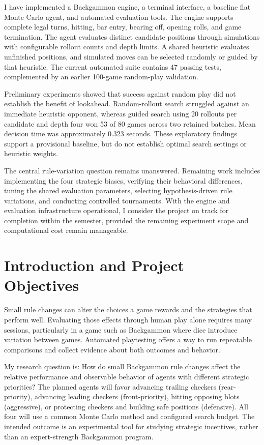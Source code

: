 \documentclass[12pt,twoside]{article}
\begin{document}
I have implemented a Backgammon engine, a terminal interface, a baseline flat Monte Carlo agent, and automated evaluation tools. The engine supports complete legal turns, hitting, bar entry, bearing off, opening rolls, and game termination. The agent evaluates distinct candidate positions through simulations with configurable rollout counts and depth limits. A shared heuristic evaluates unfinished positions, and simulated moves can be selected randomly or guided by that heuristic. The current automated suite contains 47 passing tests, complemented by an earlier 100-game random-play validation.

Preliminary experiments showed that success against random play did not establish the benefit of lookahead. Random-rollout search struggled against an immediate heuristic opponent, whereas guided search using 20 rollouts per candidate and depth four won 53 of 80 games across two retained batches. Mean decision time was approximately 0.323 seconds. These exploratory findings support a provisional baseline, but do not establish optimal search settings or heuristic weights.

The central rule-variation question remains unanswered. Remaining work includes implementing the four strategic biases, verifying their behavioral differences, tuning the shared evaluation parameters, selecting hypothesis-driven rule variations, and conducting controlled tournaments. With the engine and evaluation infrastructure operational, I consider the project on track for completion within the semester, provided the remaining experiment scope and computational cost remain manageable.

\clearpage
\section{Introduction and Project Objectives}

Small rule changes can alter the choices a game rewards and the strategies that
perform well. Evaluating those effects through human play alone requires many
sessions, particularly in a game such as Backgammon where dice introduce
variation between games. Automated playtesting offers a way to run repeatable
comparisons and collect evidence about both outcomes and behavior.

My research question is: How do small Backgammon rule changes affect the
relative performance and observable behavior of agents with different strategic
priorities? The planned agents will favor advancing trailing checkers
(rear-priority), advancing leading checkers (front-priority), hitting opposing
blots (aggressive), or protecting checkers and building safe positions
(defensive). All four will use a common Monte Carlo method and configured search
budget. The intended outcome is an experimental tool for studying strategic
incentives, rather than an expert-strength Backgammon program.
\end{document}

